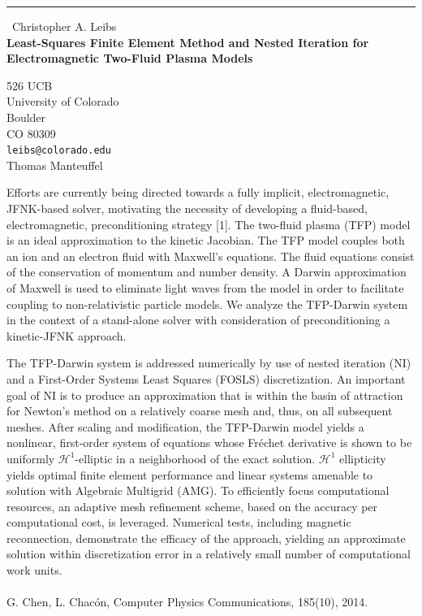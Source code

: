 \documentclass{report}
\begin{document}
\begin{center}
\rule{6in}{1pt} \
{\large Christopher A. Leibs \\
{\bf Least-Squares Finite Element Method and Nested Iteration for Electromagnetic Two-Fluid Plasma Models}}

526 UCB \\ University of Colorado \\ Boulder \\ CO 80309
\\
{\tt leibs@colorado.edu}\\
Thomas Manteuffel\end{center}

Efforts are currently being directed towards a fully implicit,
electromagnetic, JFNK-based solver, motivating the necessity of
developing a fluid-based, electromagnetic, preconditioning strategy [1].
The two-fluid plasma (TFP) model is an ideal approximation to the kinetic
Jacobian. The TFP model couples both an ion and an electron fluid with
Maxwell's equations. The fluid equations consist of the conservation of
momentum and number density. A Darwin approximation of Maxwell is used to
eliminate light waves from the model in order to facilitate coupling to
non-relativistic particle models. We analyze the TFP-Darwin system in the
context of a stand-alone solver with consideration of preconditioning a
kinetic-JFNK approach.

The TFP-Darwin system is addressed numerically by use of nested iteration
(NI) and a First-Order Systems Least Squares (FOSLS) discretization. An
important goal of NI is to produce an approximation that is within the
basin of attraction for Newton's method on a relatively coarse mesh and,
thus, on all subsequent meshes. After scaling and modification, the
TFP-Darwin model yields a nonlinear, first-order system of equations
whose Fr\'{e}chet derivative is shown to be uniformly
$\mathcal{H}^1$-elliptic in a neighborhood of the exact solution.
$\mathcal{H}^1$ ellipticity yields optimal finite element performance and
linear systems amenable to solution with Algebraic Multigrid (AMG). To
efficiently focus computational resources, an adaptive mesh refinement
scheme, based on the accuracy per computational cost, is leveraged.
Numerical tests, including magnetic reconnection, demonstrate the
efficacy of the approach, yielding an approximate solution within
discretization error in a relatively small number of computational work
units.
\\\\
\noindent[1] G. Chen, L. Chac\'{o}n, Computer Physics Communications, 185(10), 2014.
\end{document}
